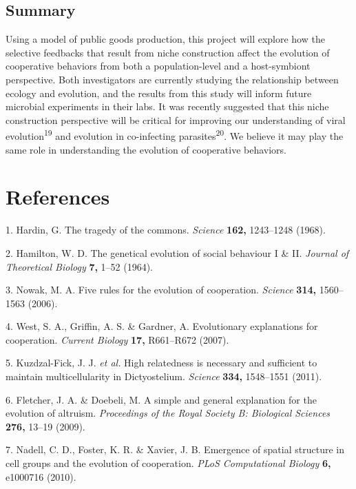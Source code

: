 \documentclass[10pt,]{article}
\begin{document}
\vspace{-0.5em}
\subsection{Summary}\label{summary}

Using a model of public goods production, this project will explore how
the selective feedbacks that result from niche construction affect the
evolution of cooperative behaviors from both a population-level and a
host-symbiont perspective. Both investigators are currently studying the
relationship between ecology and evolution, and the results from this
study will inform future microbial experiments in their labs. It was
recently suggested that this niche construction perspective will be
critical for improving our understanding of viral
evolution\textsuperscript{19} and evolution in co-infecting
parasites\textsuperscript{20}. We believe it may play the same role in
understanding the evolution of cooperative behaviors.

\clearpage

\section*{References}\label{references}

1. Hardin, G. The tragedy of the commons. \emph{Science} \textbf{162,}
1243--1248 (1968).

2. Hamilton, W. D. The genetical evolution of social behaviour I \& II.
\emph{Journal of Theoretical Biology} \textbf{7,} 1--52 (1964).

3. Nowak, M. A. Five rules for the evolution of cooperation.
\emph{Science} \textbf{314,} 1560--1563 (2006).

4. West, S. A., Griffin, A. S. \& Gardner, A. Evolutionary explanations
for cooperation. \emph{Current Biology} \textbf{17,} R661--R672 (2007).

5. Kuzdzal-Fick, J. J. \emph{et al.} High relatedness is necessary and
sufficient to maintain multicellularity in Dictyostelium. \emph{Science}
\textbf{334,} 1548--1551 (2011).

6. Fletcher, J. A. \& Doebeli, M. A simple and general explanation for
the evolution of altruism. \emph{Proceedings of the Royal Society B:
Biological Sciences} \textbf{276,} 13--19 (2009).

7. Nadell, C. D., Foster, K. R. \& Xavier, J. B. Emergence of spatial
structure in cell groups and the evolution of cooperation. \emph{PLoS
Computational Biology} \textbf{6,} e1000716 (2010).
\end{document}
